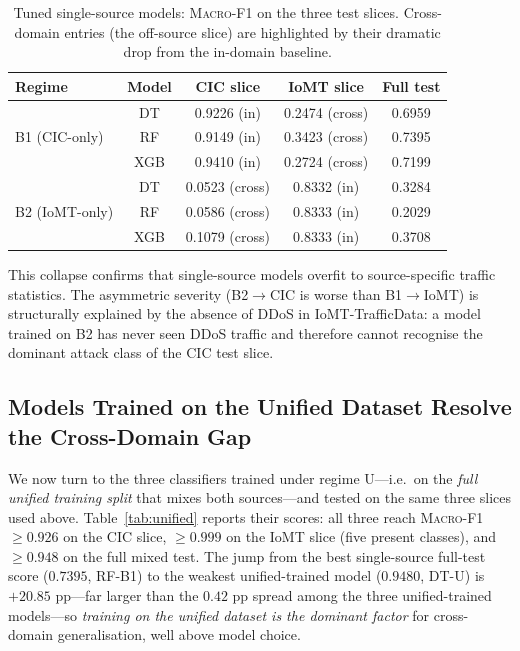 \documentclass[runningheads]{llncs}
\newcommand{\macroF}{\textsc{Macro-F1}}
\begin{document}
\begin{table}[H]
\centering
\caption{Tuned single-source models: \macroF{} on the three test slices. Cross-domain entries (the off-source slice) are highlighted by their dramatic drop from the in-domain baseline.}\label{tab:cross-domain}
\small
\begin{tabular}{@{}lcccc@{}}
\toprule
\textbf{Regime} & \textbf{Model} & \textbf{CIC slice} & \textbf{IoMT slice} & \textbf{Full test} \\
\midrule
\multirow{3}{*}{B1 (CIC-only)}  & DT  & 0.9226 (in) & 0.2474 (cross) & 0.6959 \\
                                & RF  & 0.9149 (in) & 0.3423 (cross) & 0.7395 \\
                                & XGB & 0.9410 (in) & 0.2724 (cross) & 0.7199 \\
\midrule
\multirow{3}{*}{B2 (IoMT-only)} & DT  & 0.0523 (cross) & 0.8332 (in) & 0.3284 \\
                                & RF  & 0.0586 (cross) & 0.8333 (in) & 0.2029 \\
                                & XGB & 0.1079 (cross) & 0.8333 (in) & 0.3708 \\
\bottomrule
\end{tabular}
\end{table}

This collapse confirms that single-source models overfit to source-specific traffic statistics. The asymmetric severity (B2$\to$CIC is worse than B1$\to$IoMT) is structurally explained by the absence of DDoS in IoMT-TrafficData: a model trained on B2 has never seen DDoS traffic and therefore cannot recognise the dominant attack class of the CIC test slice.

\subsection{Models Trained on the Unified Dataset Resolve the Cross-Domain Gap}
\label{subsec:unified-resolve}

We now turn to the three classifiers trained under regime U---i.e.\ on the \emph{full unified training split} that mixes both sources---and tested on the same three slices used above. Table~\ref{tab:unified} reports their scores: all three reach \macroF{} $\geq 0.926$ on the CIC slice, $\geq 0.999$ on the IoMT slice (five present classes), and $\geq 0.948$ on the full mixed test. The jump from the best single-source full-test score ($0.7395$, RF-B1) to the weakest unified-trained model ($0.9480$, DT-U) is $+20.85$ pp---far larger than the $0.42$ pp spread among the three unified-trained models---so \emph{training on the unified dataset is the dominant factor} for cross-domain generalisation, well above model choice.
\end{document}
